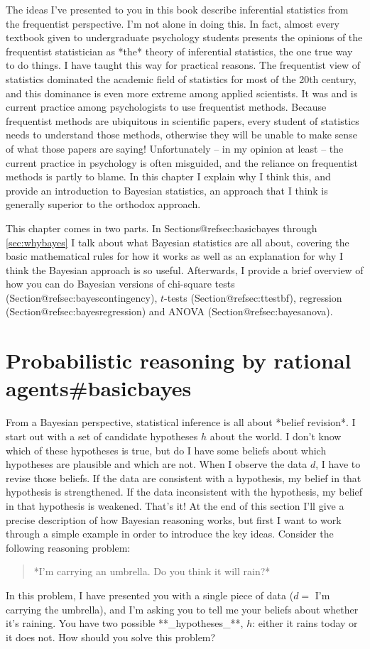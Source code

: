 \bigskip

The ideas I've presented to you in this book describe inferential statistics from the frequentist perspective. I'm not alone in doing this. In fact, almost every textbook given to undergraduate psychology students presents the opinions of the frequentist statistician as *the* theory of inferential statistics, the one true way to do things. I have taught this way for practical reasons. The frequentist view of statistics dominated the academic field of statistics for most of the 20th century, and this dominance is even more extreme among applied scientists. It was and is current practice among psychologists to use frequentist methods. Because frequentist methods are ubiquitous in scientific papers, every student of statistics needs to understand those methods, otherwise they will be unable to make sense of what those papers are saying! Unfortunately -- in my opinion at least -- the current practice in psychology is often misguided, and the reliance on frequentist methods is partly to blame. In this chapter I explain why I think this, and provide an introduction to Bayesian statistics, an approach that I think is generally superior to the orthodox approach.

This chapter comes in two parts. In Sections@refsec:basicbayes through \ref{sec:whybayes} I talk about what Bayesian statistics are all about, covering the basic mathematical rules for how it works as well as an explanation for why I think the Bayesian approach is so useful. Afterwards, I provide a brief overview of how you can do Bayesian versions of chi-square tests (Section@refsec:bayescontingency), $t$-tests (Section@refsec:ttestbf), regression (Section@refsec:bayesregression) and ANOVA (Section@refsec:bayesanova).


\section{Probabilistic reasoning by rational agents{#basicbayes}}



From a Bayesian perspective, statistical inference is all about *belief revision*. I start out with a set of candidate hypotheses $h$ about the world. I don't know which of these hypotheses is true, but do I have some beliefs about which hypotheses are plausible and which are not. When I observe the data $d$, I have to revise those beliefs. If the data are consistent with a hypothesis, my belief in that hypothesis is strengthened. If the data inconsistent with the hypothesis, my belief in that hypothesis is weakened. That's it! At the end of this section I'll give a precise description of how Bayesian reasoning works, but first I want to work through a simple example in order to introduce the key ideas. Consider the following reasoning problem:
\begin{quote}
*I'm carrying an umbrella. Do you think it will rain?*
\end{quote}
In this problem, I have presented you with a single piece of data ($d =$ I'm carrying the umbrella), and I'm asking you to tell me your beliefs about whether it's raining. You have two possible **_hypotheses_**, $h$: either it rains today or it does not. How should you solve this problem? 

